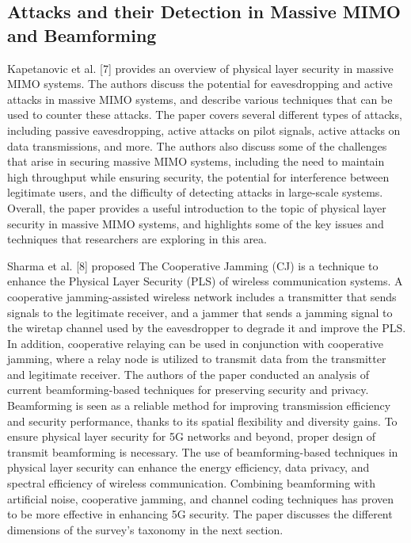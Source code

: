 \documentclass[conference]{IEEEtran}
\begin{document}
\subsection{Attacks and their Detection in Massive MIMO and Beamforming}

Kapetanovic et al. [7] provides an overview of physical layer security in massive MIMO systems. The authors discuss the potential for eavesdropping and active attacks in massive MIMO systems, and describe various techniques that can be used to counter these attacks. The paper covers several different types of attacks, including passive eavesdropping, active attacks on pilot signals, active attacks on data transmissions, and more. The authors also discuss some of the challenges that arise in securing massive MIMO systems, including the need to maintain high throughput while ensuring security, the potential for interference between legitimate users, and the difficulty of detecting attacks in large-scale systems. Overall, the paper provides a useful introduction to the topic of physical layer security in massive MIMO systems, and highlights some of the key issues and techniques that researchers are exploring in this area. 

Sharma et al. [8] proposed The Cooperative Jamming (CJ) is a technique to enhance the Physical Layer Security (PLS) of wireless communication systems. A cooperative jamming-assisted wireless network includes a transmitter that sends signals to the legitimate receiver, and a jammer that sends a jamming signal to the wiretap channel used by the eavesdropper to degrade it and improve the PLS. In addition, cooperative relaying can be used in conjunction with cooperative jamming, where a relay node is utilized to transmit data from the transmitter and legitimate receiver. The authors of the paper conducted an analysis of current beamforming-based techniques for preserving security and privacy. Beamforming is seen as a reliable method for improving transmission efficiency and security performance, thanks to its spatial flexibility and diversity gains. To ensure physical layer security for 5G networks and beyond, proper design of transmit beamforming is necessary. The use of beamforming-based techniques in physical layer security can enhance the energy efficiency, data privacy, and spectral efficiency of wireless communication. Combining beamforming with artificial noise, cooperative jamming, and channel coding techniques has proven to be more effective in enhancing 5G security. The paper discusses the different dimensions of the survey's taxonomy in the next section.
\end{document}
